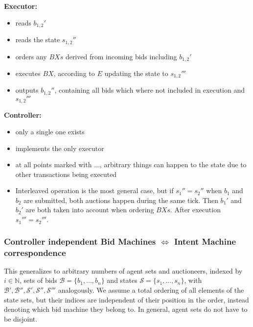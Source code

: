 \vspace{1em}
\noindent\textbf{Executor:}
\begin{itemize}
    \item reads $b_{1,2}'$
    \item reads the state $s_{1,2}''$
    \item orders any $BXs$ derived from incoming bids including $b_{1,2}'$
    \item executes $BX$, according to $E$ updating the state to $s_{1,2}'''$
    \item outputs $b_{1,2}''$, containing all bids which where not included in execution and $s_{1,2}'''$
\end{itemize}

\vspace{1em}
\noindent\textbf{Controller:}
\begin{itemize}
    \item only a single one exists
    \item implements the only executor
    \item at all points marked with $\dots$, arbitrary things can happen to the state due to other transactions being executed
    \item Interleaved operation is the most general case, but if $s_1'' = s_2''$ when $b_1$ and $b_2$ are submitted, both auctions happen during the same tick. Then $b_1'$ and $b_2'$ are both taken into account when ordering $BXs$. After execution $s_1''' = s_2'''$.
\end{itemize}

\subsubsection{Controller independent Bid Machines $\Leftrightarrow$ Intent Machine correspondence}

This generalizes to arbitrary numbers of agent sets and auctioneers, indexed by $i \in \mathbb{N}$, sets of bids $\mathcal{B} =\{b_1, \dots, b_n\}$ and states $\mathcal{S} =\{s_1, \dots, s_n\}$, with $\mathcal{B'}, \mathcal{B''}, \mathcal{S'}, \mathcal{S''}, \mathcal{S'''}$ analogously. We assume a total ordering of all elements of the state sets, but their indices are independent of their position in the order, instead denoting which bid machine they belong to. In general, agent sets do not have to be disjoint.

